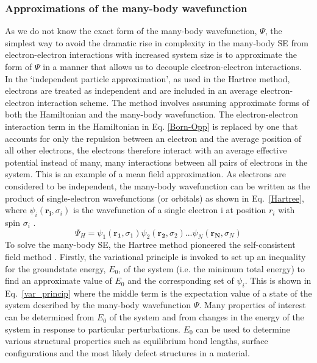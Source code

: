 \documentclass[11pt, twoside]{report}
\begin{document}
\subsubsection{Approximations of the many-body wavefunction}
As we do not know the exact form of the many-body wavefunction, $\Psi$, the simplest way to avoid the dramatic rise in complexity in the many-body SE from electron-electron interactions with increased system size is to approximate the form of $\Psi$ in a manner that allows us to decouple electron-electron interactions. In the `independent particle approximation', as used in the Hartree method, electrons are treated as independent and are included in an average electron-electron interaction scheme. The method involves assuming approximate forms of both the Hamiltonian and the many-body wavefunction. The electron-electron interaction term in the Hamiltonian in Eq. \ref{Born-Opp} is replaced by one that accounts for only the repulsion between an electron and the average position of all other electrons, the electrons therefore interact with an average effective potential instead of many, many interactions between all pairs of electrons in the system. This is an example of a mean field approximation.
As electrons are considered to be independent, the many-body wavefunction can be written as the product of single-electron wavefunctions (or orbitals) as shown in Eq.~\ref{Hartree}, where $\psi_i(\mathbf{r_i}, \sigma_i)$ is the wavefunction of a single electron i at position $r_i$ with spin $\sigma_i$ \cite{Prasad_ch2}. 
\begin{equation}\label{Hartree}
\Psi_H = \psi_1(\mathbf{r_1}, \sigma_1) \psi_2(\mathbf{r_2}, \sigma_2) ... \psi_N(\mathbf{r_N}, \sigma_N)
\end{equation}
To solve the many-body SE, the Hartree method pioneered the self-consistent field method \cite{RichardMartin_Ch1}. Firstly, the variational principle is invoked to set up an inequality for the groundstate energy, $E_0$, of the system (i.e. the minimum total energy) to find an approximate value of $E_0$ and the corresponding set of $\psi_i$. This is shown in Eq.~\ref{var_princip} where the middle term is the expectation value of a state of the system described by the many-body wavefunction $\Psi$. Many properties of interest can be determined from $E_0$ of the system and from changes in the energy of the system in response to particular perturbations. $E_0$ can be used to determine various structural properties such as equilibrium bond lengths, surface configurations and the most likely defect structures in a material.
\end{document}
